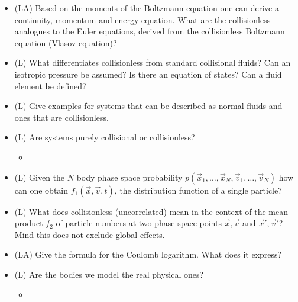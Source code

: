 \begin{itemize}
    \item (LA) Based on the moments of the Boltzmann equation one can derive
    a continuity, momentum and energy equation. What are the collisionless analogues
    to the Euler equations, derived from the collisionless Boltzmann equation (Vlasov equation)?
    \answerboxS
    \item (L) What differentiates collisionless from standard collisional fluids? Can an isotropic
    pressure be assumed? Is there an equation of states? Can a fluid element be defined?
    \answerboxM
    \item (L) Give examples for systems that can be described as normal fluids and ones that are collisionless.
    \answerboxS
    \item (L) Are systems purely collisional or collisionless?
    \begin{itemize}
        \item {}
    \end{itemize}
    \answerboxM
    \item (L) Given the $N$ body phase space probability $p\left(\vec{x}_1, \ldots, \vec{x}_N, \vec{v}_1, \ldots, \vec{v}_N\right)$ how
    can one obtain $f_1(\vec{x}, \vec{v}, t)$, the distribution function of a single particle?
    \answerboxM
    \item (L) What does collisionless (uncorrelated) mean in the context of the mean product $f_2$ of particle numbers
    at two phase space points $\vec{x}, \vec{v}$ and $\vec{x}', \vec{v}'$? Mind this does not exclude global effects.
    \answerboxM
    \item (LA) Give the formula for the Coulomb logarithm. What does it express?
    \answerboxS
    \item (L) Are the bodies we model the real physical ones?
    \begin{itemize}
        \item {}

\end{itemize}
\end{itemize}
